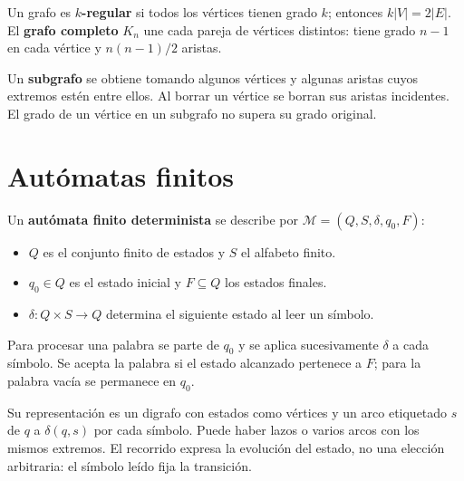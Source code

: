 Un grafo es \textbf{$k$-regular} si todos los vértices tienen grado $k$;
entonces $k|V|=2|E|$.
El \textbf{grafo completo} $K_n$ une cada pareja de vértices distintos:
tiene grado $n-1$ en cada vértice y $n(n-1)/2$ aristas.

Un \textbf{subgrafo} se obtiene tomando algunos vértices y algunas
aristas cuyos extremos estén entre ellos. Al borrar un vértice se borran
sus aristas incidentes. El grado de un vértice en un subgrafo no supera
su grado original.

\section{Autómatas finitos}

Un \textbf{autómata finito determinista} se describe por
$\mathcal M=(Q,S,\delta,q_0,F)$:
\begin{itemize}
 \item $Q$ es el conjunto finito de estados y $S$ el alfabeto finito.
 \item $q_0\in Q$ es el estado inicial y $F\subseteq Q$ los estados finales.
 \item $\delta:Q\times S\to Q$ determina el siguiente estado al leer un símbolo.
\end{itemize}
Para procesar una palabra se parte de $q_0$ y se aplica sucesivamente
$\delta$ a cada símbolo. Se acepta la palabra si el estado alcanzado
pertenece a $F$; para la palabra vacía se permanece en $q_0$.

Su representación es un digrafo con estados como vértices y un arco
etiquetado $s$ de $q$ a $\delta(q,s)$ por cada símbolo.
Puede haber lazos o varios arcos con los mismos extremos.
El recorrido expresa la evolución del estado, no una elección arbitraria:
el símbolo leído fija la transición.

